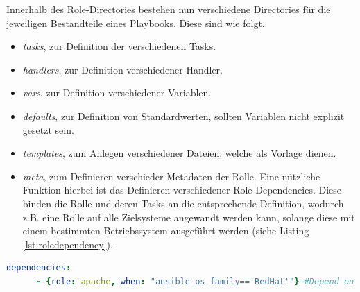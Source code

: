 \documentclass[biblatex]{lni}
\begin{document}
Innerhalb des Role-Directories bestehen nun verschiedene Directories für die jeweiligen Bestandteile eines Playbooks. Diese sind wie folgt.
\begin{itemize}
    \item \textit{tasks}, zur Definition der verschiedenen Tasks.
    \item \textit{handlers}, zur Definition verschiedener Handler.
    \item \textit{vars}, zur Definition verschiedener Variablen.
    \item \textit{defaults}, zur Definition von Standardwerten, sollten Variablen nicht explizit gesetzt sein.
    \item \textit{templates}, zum Anlegen verschiedener Dateien, welche als Vorlage dienen.
    \item \textit{meta}, zum Definieren verschieder Metadaten der Rolle. Eine nützliche Funktion hierbei ist das Definieren verschiedener Role Dependencies. Diese binden die Rolle und deren Tasks an die entsprechende Definition, wodurch z.B. eine Rolle auf alle Zielsysteme angewandt werden kann, solange diese mit einem bestimmten Betriebssystem ausgeführt werden (siehe Listing \ref{lst:roledependency}).
\end{itemize}
\begin{lstlisting}[language=yaml, caption={Ausschnitt der \textit{main.yaml} des \textit{meta}-Directories, welche eine Role Dependency definiert}, label=lst:roledependency]
    dependencies: 
      - {role: apache, when: "ansible_os_family=='RedHat'"} #Depend on Apache role, if our host is of OS type RedHat
\end{lstlisting}
\end{document}
